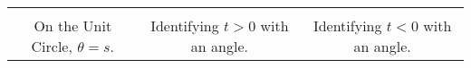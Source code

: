 \documentclass[12pt]{ximera}
\begin{document}
\begin{tabular}{ccc}

 

&

 

&

  \\

On the Unit Circle, $\theta = s$.

&

Identifying $t > 0$ with an angle.

&

Identifying $t < 0$ with an angle. \\


\end{tabular}
\end{document}
